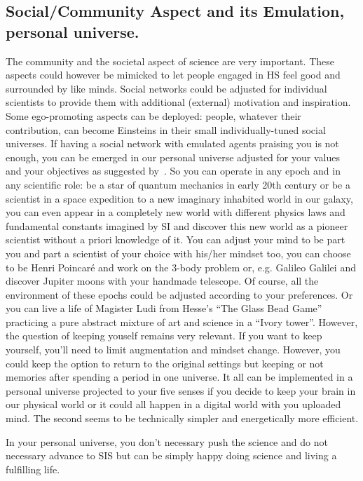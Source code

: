 \documentclass[a4paper,11pt]{article}
\begin{document}
\subsection{Social/Community Aspect and its Emulation, personal universe.\label{subsection:personal-universe}}
The community and the societal aspect of science are very important. These aspects could however be mimicked to let people engaged in HS feel good and surrounded by like minds. Social networks could be adjusted for individual scientists to provide them with additional (external) motivation and inspiration. Some ego-promoting aspects can be deployed: people, whatever their contribution, can become Einsteins in their small individually-tuned social universes. If having a social network with emulated agents praising you is not enough, you can be emerged in our personal universe adjusted for your values and your objectives as suggested by~\textcite{Yampolskiy2019}. So you can operate in any epoch and in any scientific role: be a star of quantum mechanics in early 20th century or be a scientist in a space expedition to a new imaginary inhabited world in our galaxy, you can even appear in a completely new world with different physics laws and fundamental constants imagined by SI and discover this new world as a pioneer scientist without a priori knowledge of it. You can adjust your mind to be part you and part a scientist of your choice with his/her mindset too, you can choose to be Henri Poincaré and work on the 3-body problem or, e.g. Galileo Galilei and discover Jupiter moons with your handmade telescope. Of course, all the environment of these epochs could be adjusted according to your preferences. Or you can live a life of Magister Ludi from Hesse's ``The Glass Bead Game'' practicing a pure abstract mixture of art and science in a ``Ivory tower''. However, the question of keeping youself remains very relevant. If you want to keep yourself, you'll need to limit augmentation and mindset change. However, you could keep the option to return to the original settings but keeping or not memories after spending a period in one universe. It all can be implemented in a personal universe projected to your five senses if you decide to keep your brain in our physical world or it could all happen in a digital world with you uploaded mind. The second seems to be technically simpler and energetically more efficient.

In your personal universe, you don't necessary push the science and do not necessary advance to SIS but can be simply happy doing science and living a fulfilling life.
\end{document}
